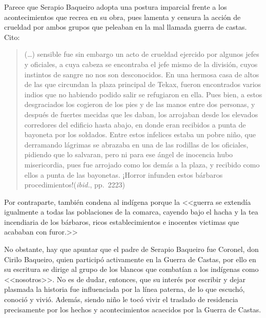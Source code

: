 Parece que Serapio Baqueiro adopta una postura imparcial frente a los
acontecimientos que recrea en su obra, pues lamenta y censura la acción de
crueldad por ambos grupos que peleaban en la mal llamada guerra de castas.
Cito:

\begin{quotation}
(\ldots) sensible fue sin embargo un acto de crueldad ejercido por algunos jefes y
oficiales, a cuya cabeza se encontraba el jefe mismo de la división, cuyos
instintos de sangre no nos son desconocidos. En una hermosa casa de altos
de las que circundan la plaza principal de Tekax, fueron encontrados varios
indios que no habiendo podido salir se refugiaron en ella. Pues bien, a
estos desgraciados los cogieron de los pies y de las manos entre dos
personas, y después de fuertes mecidas que les daban, los arrojaban desde
los elevados corredores del edificio hasta abajo,  en donde eran recibidos
a punta de bayoneta por los soldados. Entre estos infelices estaba un pobre
niño, que derramando lágrimas se abrazaba en una de las rodillas de los
oficiales, pidiendo que lo salvaran, pero ni para ese ángel de inocencia
hubo misericordia, pues fue arrojado como los demás a la plaza, y recibido
como ellos a punta de las bayonetas. ¡Horror infunden estos bárbaros
procedimientos!\linebreak (\textit{ibid.}, pp.~22\textendash{}23)
\end{quotation}

Por contraparte, también condena al indígena porque la
<<guerra se extendía igualmente a todas las poblaciones de la comarca,
cayendo bajo el hacha y la tea incendiaria de los bárbaros, ricos
establecimientos e inocentes victimas que acababan con furor.>>

No obstante, hay que apuntar que el padre de Serapio
Baqueiro fue Coronel, don Cirilo Baqueiro, quien participó activamente en
la Guerra de Castas, por ello en su escritura se dirige al grupo de los
blancos que combatían a los indígenas como <<nosotros>>. No es de dudar,
entonces,  que su interés por escribir y dejar plasmada la historia fue
influenciada por la línea paterna, de lo que escuchó, conoció y vivió.
Además, siendo niño le tocó vivir el traslado de residencia precisamente
por los hechos y acontecimientos acaecidos por la Guerra de Castas.

